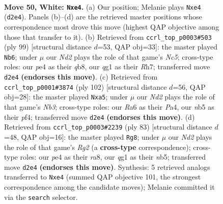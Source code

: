 \documentclass[11pt]{article}
\begin{document}
\clearpage

\begin{figure}[p]\centering
\begin{subfigure}{0.46\textwidth}\centering
\resizebox{\linewidth}{!}{%
\newchessgame
\chessboard[
  setfen={6k1/1r3pb1/R7/1n1P2R1/4p3/3K4/3N2N1/6q1 w - - 0 50},
  showmover=false,
  pgfstyle=straightmove, color=movearrow, markmove={d2-e4}
]}
\caption{}
\end{subfigure}\hfill
\begin{subfigure}{0.46\textwidth}\centering
\resizebox{\linewidth}{!}{%
\newchessgame
\chessboard[
  setfen={1Q6/7r/4r2P/1kn5/1pn5/8/P1P5/2K4R b - - 22 50},
  showmover=false,
  pgfstyle=straightmove, color=movearrow, markmove={c4-b6}
]}
\caption{}
\end{subfigure}
\\[4pt]
\begin{subfigure}{0.46\textwidth}\centering
\resizebox{\linewidth}{!}{%
\newchessgame
\chessboard[
  setfen={1r6/5p2/1n6/pR6/P3kp2/1N6/5K2/8 w - - 4 52},
  showmover=false,
  pgfstyle=straightmove, color=movearrow, markmove={b3-a5}
]}
\caption{}
\end{subfigure}\hfill
\begin{subfigure}{0.46\textwidth}\centering
\resizebox{\linewidth}{!}{%
\newchessgame
\chessboard[
  setfen={R6k/6rp/8/1N5R/8/6P1/3r1n1P/6K1 b - - 4 42},
  showmover=false,
  pgfstyle=straightmove, color=movearrow, markmove={g7-g8}
]}
\caption{}
\end{subfigure}
\caption{\textbf{Move 50, White: \texttt{Nxe4}.} (a) Our position; Melanie plays \texttt{Nxe4} (\texttt{d2e4}). Panels (b)--(d) are the retrieved master positions whose correspondence most drove this move (highest QAP objective among those that transfer to it). (b) Retrieved from \texttt{ccrl\_top\_p0003\#503} (ply 99) [structural distance $d$=53, QAP obj=33]: the master played \texttt{Nb6}; under $\mu$ our \emph{Nd2} plays the role of that game's \emph{Nc5}; cross-type roles: our \emph{p}e4 as their \emph{q}b8, our \emph{q}g1 as their \emph{R}h7; transferred move \texttt{d2e4} \textbf{(endorses this move)}. (c) Retrieved from \texttt{ccrl\_top\_p0001\#3874} (ply 102) [structural distance $d$=56, QAP obj=28]: the master played \texttt{Nxa5}; under $\mu$ our \emph{Nd2} plays the role of that game's \emph{Nb3}; cross-type roles: our \emph{R}a6 as their \emph{P}a4, our \emph{n}b5 as their \emph{p}f4; transferred move \texttt{d2e4} \textbf{(endorses this move)}. (d) Retrieved from \texttt{ccrl\_top\_p0003\#2239} (ply 83) [structural distance $d$=48, QAP obj=16]: the master played \texttt{Rg8}; under $\mu$ our \emph{Nd2} plays the role of that game's \emph{Rg2} (a \textbf{cross-type} correspondence); cross-type roles: our \emph{p}e4 as their \emph{r}a8, our \emph{q}g1 as their \emph{n}b5; transferred move \texttt{d2e4} \textbf{(endorses this move)}. Synthesis: 5 retrieved analogs transferred to \texttt{Nxe4} (summed QAP objective 101, the strongest correspondence among the candidate moves); Melanie committed it via the \texttt{search} selector.}
\label{fig:thought-m98}
\end{figure}
\end{document}
